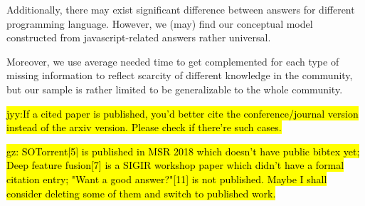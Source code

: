 \documentclass[10pt,conference]{IEEEtran}
\newcommand{\jyy}[1]{\sethlcolor{yellow}\hl{jyy:#1}\xspace}
\newcommand{\gz}[1]{\sethlcolor{lime}\hl{gz:#1}\xspace}
\begin{document}
Additionally, there may exist significant difference between answers for different programming language. 
However, we (may) find our conceptual model constructed from javascript-related answers rather universal.

Moreover, we use average needed time to get complemented for each type of missing information to reflect scarcity of different knowledge in the community, but our sample is rather limited to be generalizable to the whole community. 


\jyy{If a cited paper is published, you'd better cite the conference/journal version instead of the arxiv version. Please check if there're such cases.}

\gz{ SOTorrent[5] is published in MSR 2018 which doesn't have public bibtex yet; Deep feature fusion[7] is a SIGIR workshop paper which didn't have a formal citation entry; "Want a good answer?"[11] is not published. Maybe I shall consider deleting some of them and switch to published work.}



\end{document}
